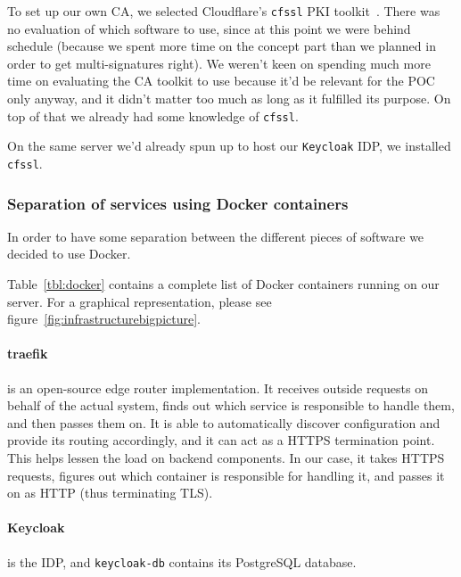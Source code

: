 To set up our own \gls{CA}, we selected Cloudflare's \texttt{cfssl} \gls{PKI} toolkit~\cite{cfssl}.
There was no evaluation of which software to use,
since at this point we were behind schedule
(because we spent more time on the concept part than we planned in order to get multi-signatures right).
We weren't keen on spending much more time on evaluating the \gls{CA} toolkit to use because it'd be relevant for the \gls{POC} only anyway,
and it didn't matter too much as long as it fulfilled its purpose.
On top of that we already had some knowledge of \texttt{cfssl}.

On the same server we'd already spun up to host our \texttt{Keycloak} \gls{IDP},
we installed \texttt{cfssl}.

\subsubsection{Separation of services using Docker containers}


In order to have some separation between the different pieces of software we decided to use Docker.

Table~\ref{tbl:docker} contains a complete list of Docker containers running on our server.
For a graphical representation, please see figure~\ref{fig:infrastructurebigpicture}.

\paragraph{traefik} is an open-source edge router implementation.
It receives outside requests on behalf of the actual system,
finds out which service is responsible to handle them,
and then passes them on.
It is able to automatically discover configuration and provide its routing accordingly,
and it can act as a \gls{HTTPS} termination point.
This helps lessen the load on backend components.
In our case, it takes \gls{HTTPS} requests, figures out which container is responsible for handling it,
and passes it on as \gls{HTTP} (thus terminating \gls{TLS}).


\paragraph{Keycloak} is the \gls{IDP}, and \texttt{keycloak-db} contains its PostgreSQL database.
